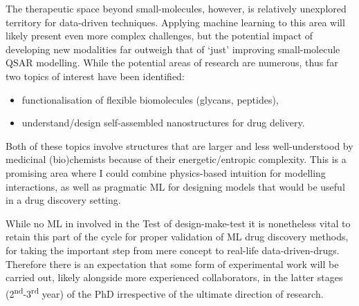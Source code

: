 The therapeutic space beyond small-molecules, however, is relatively unexplored territory for data-driven techniques. Applying machine learning to this area will likely present even more complex challenges, but the potential impact of developing new modalities far outweigh that of `just' improving small-molecule QSAR modelling. While the potential areas of research are numerous, thus far two topics of interest have been identified:

\begin{itemize}
    \item functionalisation of flexible biomolecules (glycans, peptides),
    \item understand/design self-assembled nanostructures for drug delivery.
\end{itemize}

Both of these topics involve structures that are larger and less well-understood by medicinal (bio)chemists because of their energetic/entropic complexity. This is a promising area where I could combine physics-based intuition for modelling interactions, as well as pragmatic ML for designing models that would be useful in a drug discovery setting.

While no ML in involved in the Test of design-make-test it is nonetheless vital to retain this part of the cycle for proper validation of ML drug discovery methods, for taking the important step from mere concept to real-life data-driven-drugs. Therefore there is an expectation that some form of experimental work will be carried out, likely alongside more experienced collaborators, in the latter stages (2\textsuperscript{nd}-3\textsuperscript{rd} year) of the PhD irrespective of the ultimate direction of research.





